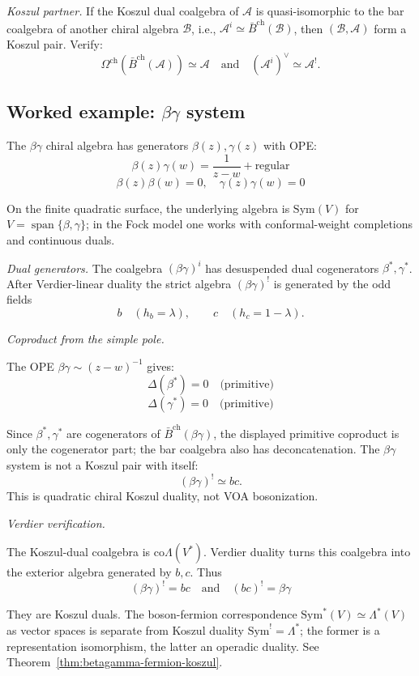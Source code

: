 \emph{Koszul partner.}
If the Koszul dual coalgebra of $\mathcal{A}$ is quasi-isomorphic to the bar coalgebra of another chiral algebra $\mathcal{B}$, i.e.,
$\mathcal{A}^i\simeq \bar{B}^{\mathrm{ch}}(\mathcal{B})$,
then $(\mathcal{B}, \mathcal{A})$ form a Koszul pair. Verify:
\[
\Omega^{\mathrm{ch}}(\bar{B}^{\mathrm{ch}}(\mathcal{A})) \simeq \mathcal{A}
\quad\text{and}\quad
(\mathcal{A}^i)^\vee \simeq \mathcal{A}^!.
\]

\subsection{\texorpdfstring{Worked example: $\beta\gamma$ system}{Worked example: system}}

\begin{computation}\label{comp:betagamma-dual}
The $\beta\gamma$ chiral algebra has generators $\beta(z), \gamma(z)$ with OPE:
\[\beta(z) \gamma(w) = \frac{1}{z-w} + \text{regular}\]
\[\beta(z) \beta(w) = 0, \quad \gamma(z) \gamma(w) = 0\]

On the finite quadratic surface, the underlying algebra is
$\mathrm{Sym}(V)$ for
$V=\operatorname{span}\{\beta,\gamma\}$; in the Fock model one works
with conformal-weight completions and continuous duals.

\emph{Dual generators.}
The coalgebra $(\beta\gamma)^i$ has desuspended dual cogenerators
$\beta^*,\gamma^*$. After Verdier-linear duality the strict algebra
$(\beta\gamma)^!$ is generated by the odd fields
\[
b\quad(h_b=\lambda),\qquad c\quad(h_c=1-\lambda).
\]

\emph{Coproduct from the simple pole.}

The OPE $\beta \gamma \sim (z-w)^{-1}$ gives:
\[\Delta(\beta^*) = 0 \quad \text{(primitive)}\]
\[\Delta(\gamma^*) = 0 \quad \text{(primitive)}\]

Since $\beta^*,\gamma^*$ are cogenerators of
$\bar{B}^{\mathrm{ch}}(\beta\gamma)$, the displayed primitive
coproduct is only the cogenerator part; the bar coalgebra also has
deconcatenation. The $\beta\gamma$ system is not a Koszul pair with
itself:
\[
(\beta\gamma)^!\simeq bc.
\]
This is quadratic chiral Koszul duality, not VOA bosonization.

\emph{Verdier verification.}

The Koszul-dual coalgebra is $\mathrm{co}\Lambda(V^*)$. Verdier
duality turns this coalgebra into the exterior algebra generated by
$b,c$. Thus
\[(\beta\gamma)^! = bc \quad \text{and} \quad (bc)^! = \beta\gamma\]

They are Koszul duals. The boson-fermion correspondence
$\mathrm{Sym}^*(V) \simeq \Lambda^*(V)$ as vector spaces is separate
from Koszul duality $\mathrm{Sym}^! = \Lambda^*$; the former is a
representation isomorphism, the latter an operadic duality. See
Theorem~\ref{thm:betagamma-fermion-koszul}.
\end{computation}

